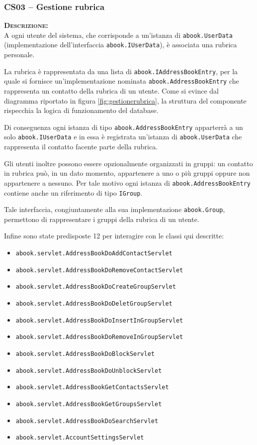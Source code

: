 \subsubsection{CS03 -- Gestione rubrica}\label{sec:cs03}
\begin{description}
	\item{\scshape\bfseries Descrizione:}\\
A ogni utente del sistema, che corrisponde a un'istanza di \texttt{abook.UserData} (implementazione dell'interfaccia \texttt{abook.IUserData}), è associata una rubrica personale. 

La rubrica è rappresentata da una lista di \texttt{abook.IAddressBookEntry}, per la quale si fornisce un'implementazione nominata \texttt{abook.AddressBookEntry} che rappresenta un contatto della rubrica di un utente. Come si evince dal diagramma riportato in figura \ref{fig:gestionerubrica}, la struttura del componente rispecchia la logica di funzionamento del database.

Di conseguenza ogni istanza di tipo \texttt{abook.AddressBookEntry} apparterrà a un solo \texttt{abook.IUserData} e in essa è registrata un'istanza di \texttt{abook.UserData} che rappresenta il contatto facente parte della rubrica.

Gli utenti inoltre possono essere opzionalmente organizzati in gruppi: un contatto in rubrica può, in un dato momento, appartenere a uno o più gruppi oppure non appartenere a nessuno. Per tale motivo ogni istanza di \texttt{abook.AddressBookEntry} contiene anche un riferimento di tipo \texttt{IGroup}.

Tale interfaccia, congiuntamente alla sua implementazione \texttt{abook.Group}, permettono di rappresentare i gruppi della rubrica di un utente.

Infine sono state predisposte 12  per interagire con le classi qui descritte:

\begin{itemize}
	\item \texttt{abook.servlet.AddressBookDoAddContactServlet}
	\item \texttt{abook.servlet.AddressBookDoRemoveContactServlet}
	\item \texttt{abook.servlet.AddressBookDoCreateGroupServlet}
	\item \texttt{abook.servlet.AddressBookDoDeletGroupServlet}
	\item \texttt{abook.servlet.AddressBookDoInsertInGroupServlet}
	\item \texttt{abook.servlet.AddressBookDoRemoveInGroupServlet}
	\item \texttt{abook.servlet.AddressBookDoBlockServlet}
	\item \texttt{abook.servlet.AddressBookDoUnblockServlet}
	\item \texttt{abook.servlet.AddressBookGetContactsServlet}
	\item \texttt{abook.servlet.AddressBookGetGroupsServlet}
	\item \texttt{abook.servlet.AddressBookDoSearchServlet}
	\item \texttt{abook.servlet.AccountSettingsServlet}
\end{itemize}


\end{description}
